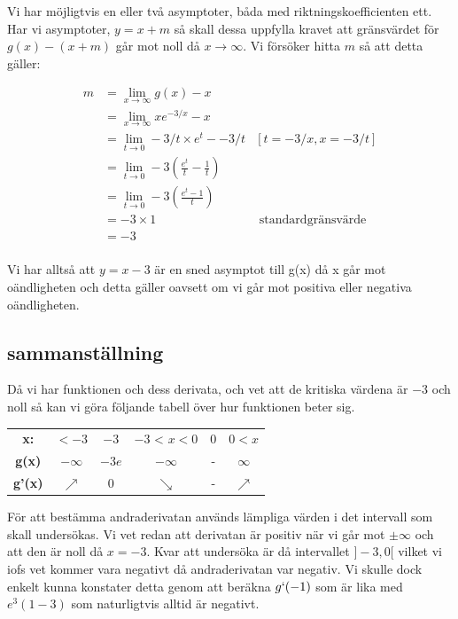 \documentclass[a4paper, 11pt]{article}
\begin{document}
Vi har möjligtvis en eller två asymptoter, båda med riktningskoefficienten
ett. Har vi asymptoter, $y = x + m$ så skall dessa uppfylla kravet att
gränsvärdet för $g(x) - (x+m)$ går mot noll då $x \rightarrow
\infty$. Vi försöker hitta $m$ så att detta gäller:

\begin{align*}
  m &= \lim\limits_{x \to \infty} g(x) - x\\
  &=  \lim\limits_{x \to \infty} x e^{-3/x} - x \\
  &=  \lim\limits_{t \to 0} -3/t \times e^{t} - -3/t &[t = -3/x, x = -3/t]\\
  &=  \lim\limits_{t \to 0} -3 (\frac{e^{t}}{t} - \frac{1}{t})\\
  &=  \lim\limits_{t \to 0} -3 (\frac{e^{t} - 1}{t})\\
  &=  -3 \times 1   &\text{ standardgränsvärde}\\
  &=  -3 \\
\end{align*}

Vi har alltså att $y = x -3$ är en sned asymptot till g(x) då x går
mot oändligheten och detta gäller oavsett om vi går mot positiva eller
negativa oändligheten.

\subsection*{sammanställning}
  
Då vi har funktionen och dess derivata, och vet att de kritiska värdena
är $-3$ och noll så kan vi göra följande tabell över hur funktionen
beter sig.

\begin{center}
\begin{tabular}{|c|c|c|c|c|c|}
{\bf x:} & $< -3$ & $-3$ & $-3$ < $x < 0$ & $0$ & $0 < x$ \\
{\bf g(x)} & $-\infty$ & $-3 e$&$ -\infty$& - & $\infty$\\
{\bf g'(x)} & $\nearrow$& 0 & $\searrow$& - & $\nearrow$\\
\end{tabular}
\end{center}

För att bestämma andraderivatan används lämpliga värden i det
intervall som skall undersökas. Vi vet redan att derivatan är positiv
när vi går mot $\pm\infty$ och att den är noll då $x = -3$. Kvar att
undersöka är då intervallet $]-3,0[$ vilket vi iofs vet kommer vara
negativt då andraderivatan var negativ. Vi skulle dock enkelt kunna
konstater detta genom att beräkna $g`(-1)$ som är lika med
$e^{3}(1-3)$ som naturligtvis alltid är negativt.
\end{document}
